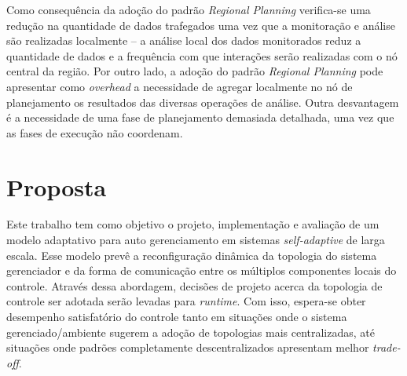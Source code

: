 \documentclass[conference]{IEEEtran}
\begin{document}
Como consequência da adoção do padrão \textit{Regional Planning} verifica-se uma redução na quantidade de dados trafegados uma vez que a monitoração e análise são realizadas localmente -- a análise local dos dados monitorados reduz a quantidade de dados e a frequência com que interações serão realizadas com o nó central da região. Por outro lado, a adoção do padrão \textit{Regional Planning} pode apresentar como \textit{overhead} a necessidade de agregar localmente no nó de planejamento os resultados das diversas operações de análise. Outra desvantagem é a necessidade de uma fase de planejamento demasiada detalhada, uma vez que as fases de execução não coordenam.



\section{Proposta}

Este trabalho tem como objetivo o projeto, implementação e avaliação de um modelo adaptativo para auto gerenciamento em sistemas \textit{self-adaptive} de larga escala. Esse modelo prevê a reconfiguração dinâmica da topologia do sistema gerenciador e da forma de comunicação entre os múltiplos componentes locais do controle. Através dessa abordagem, decisões de projeto acerca da topologia de controle ser adotada serão levadas para \textit{runtime}. Com isso, espera-se obter desempenho satisfatório do controle tanto em situações onde o sistema gerenciado/ambiente sugerem a adoção de topologias mais centralizadas, até situações onde padrões completamente descentralizados apresentam melhor \textit{trade-off}.
\end{document}

